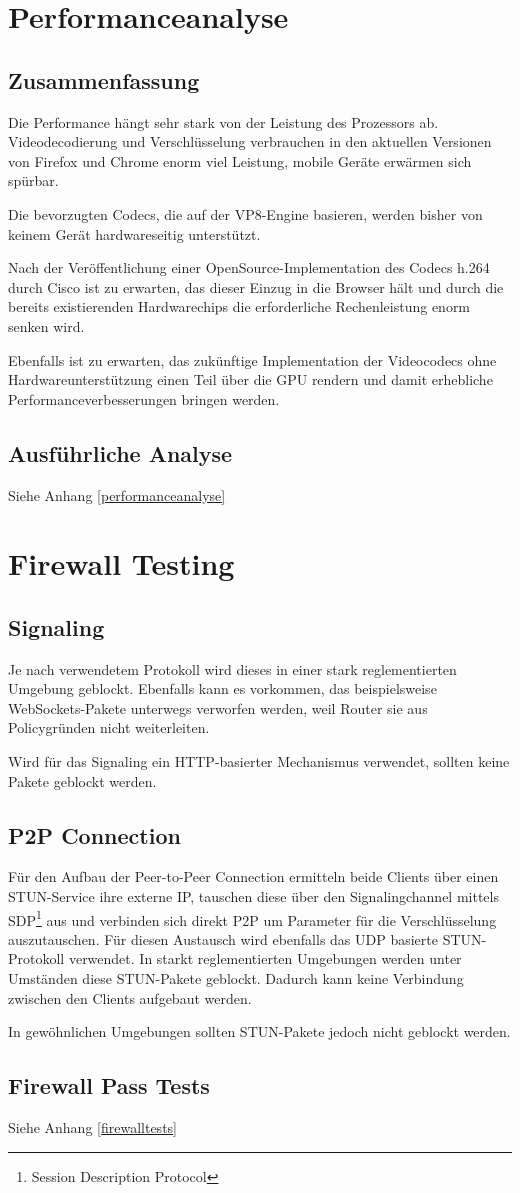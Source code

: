 \chapter{Performanceanalyse}
	\section{Zusammenfassung}
		Die Performance hängt sehr stark von der Leistung des Prozessors ab. Videodecodierung und Verschlüsselung verbrauchen in den aktuellen Versionen von Firefox und Chrome enorm viel Leistung, mobile Geräte erwärmen sich spürbar.
		
		Die bevorzugten Codecs, die auf der VP8-Engine basieren, werden bisher von
		keinem Gerät hardwareseitig unterstützt.
		
		Nach der Veröffentlichung einer OpenSource-Implementation des Codecs h.264
		durch Cisco ist zu erwarten, das dieser Einzug in die Browser hält und durch die bereits existierenden Hardwarechips die erforderliche Rechenleistung enorm senken wird.
		
		Ebenfalls ist zu erwarten, das zukünftige Implementation der Videocodecs ohne Hardwareunterstützung einen Teil über die GPU rendern und damit erhebliche Performanceverbesserungen bringen werden.
		
	\section{Ausführliche Analyse}
		Siehe Anhang \ref{performanceanalyse}
	
	
\chapter{Firewall Testing}
	\section{Signaling}
		Je nach verwendetem Protokoll wird dieses in einer stark reglementierten
		Umgebung geblockt. Ebenfalls kann es vorkommen, das beispielsweise
		WebSockets-Pakete unterwegs verworfen werden, weil Router sie aus
		Policygründen nicht weiterleiten.
		
		Wird für das Signaling ein HTTP-basierter Mechanismus verwendet, sollten
		keine Pakete geblockt werden.

	\section{P2P Connection}
		Für den Aufbau der Peer-to-Peer Connection ermitteln beide Clients über einen
		STUN-Service ihre externe IP, tauschen diese über den Signalingchannel
		mittels SDP\footnote{Session Description Protocol} aus und verbinden sich
		direkt P2P um Parameter für die Verschlüsselung auszutauschen. Für diesen
		Austausch wird ebenfalls das UDP basierte STUN-Protokoll verwendet.
		In starkt reglementierten Umgebungen werden unter Umständen diese STUN-Pakete
		geblockt. Dadurch kann keine Verbindung zwischen den Clients aufgebaut werden.
		
		In gewöhnlichen Umgebungen sollten STUN-Pakete jedoch nicht geblockt werden.
	
	\section{Firewall Pass Tests}
		Siehe Anhang \ref{firewalltests}